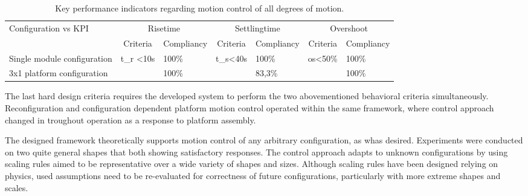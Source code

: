 \begin{table}[H]
	\centering
	\begin{tabular}{lllllll}
		\multirow{2}{*}{Configuration vs KPI} & \multicolumn{2}{c}{Risetime}                                         & \multicolumn{2}{c}{Settlingtime}                                     & \multicolumn{2}{c}{Overshoot}                                       \\
		& \multicolumn{1}{c}{Criteria}        & \multicolumn{1}{c}{Compliancy} & \multicolumn{1}{c}{Criteria}        & \multicolumn{1}{c}{Compliancy} & \multicolumn{1}{c}{Criteria}       & \multicolumn{1}{c}{Compliancy} \\ \cline{1-7} 
		Single module configuration           & \multirow{2}{*}{t\_r \textless 10s} & 100\%                          & \multirow{2}{*}{t\_s\textless{}40s} & 100\%                          & \multirow{2}{*}{os\textless{}50\%} & 100\%                          \\
		3x1 platform configuration            &                                     & 100\%                          &                                     & 83,3\%                         &                                    & 100\%                         
	\end{tabular}
	\caption{Key performance indicators regarding motion control of all degrees of motion.}
	\label{tab:KPIresultsMotion}
\end{table}


The last hard design criteria requires the developed system to perform the two abovementioned behavioral criteria simultaneously. Reconfiguration and configuration dependent platform motion control operated within the same framework, where control approach changed in troughout operation as a response to platform assembly. 


The designed framework theoretically supports motion control of any arbitrary configuration, as whas desired. Experiments were conducted on two quite general shapes that both showing satisfactory responses. The control approach adapts to unknown configurations by using scaling rules aimed to be representative over a wide variety of shapes and sizes. Although scaling rules have been designed relying on physics, used assumptions need to be re-evaluated for correctness of future configurations, particularly with more extreme shapes and scales. 

